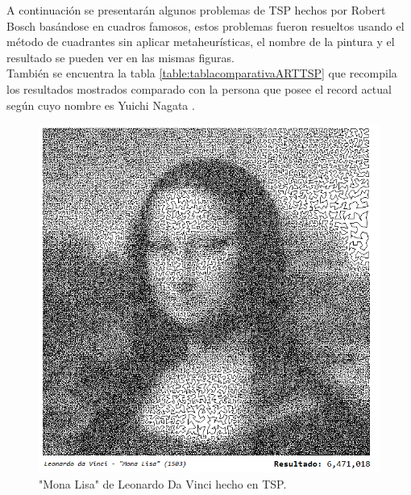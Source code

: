 \hspace*{1cm} A continuación se presentarán algunos problemas de TSP hechos por Robert Bosch basándose en cuadros famosos, estos problemas fueron resueltos usando el método de cuadrantes sin aplicar metaheurísticas, el nombre de la pintura y el resultado se pueden ver en las mismas figuras.\\
\hspace*{1cm} También se encuentra la tabla \ref{table:tablacomparativaARTTSP} que recompila los resultados mostrados comparado con la persona que posee el record actual según \cite{[MONALISA]} cuyo nombre es Yuichi Nagata \cite{[TOKYO]}.\\

 

\clearpage \newpage
      
    \begin{figure}[hbtp]
        \centering
            \includegraphics[width=1\textwidth]{PruebasResultados/Imagenes/TSP_ART/monalisatsp.png}
            \caption{"Mona Lisa" de Leonardo Da Vinci hecho en TSP.}
            \label{fig:monalisatsp.png}
    \end{figure}
      \clearpage \newpage  
      
